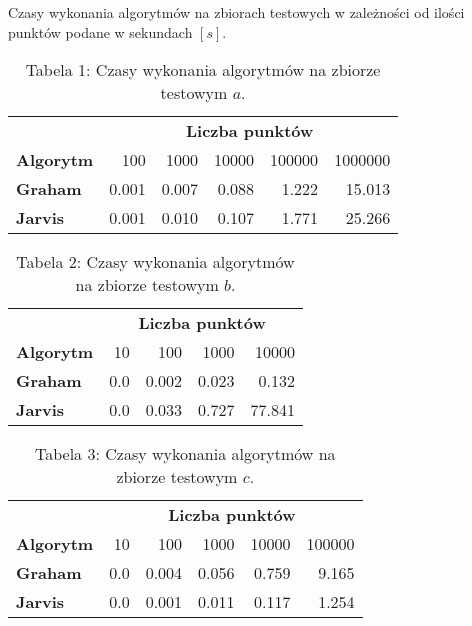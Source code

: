\quad Czasy wykonania algorytmów na zbiorach testowych w zależności od ilości punktów podane w sekundach $[s]$.
\renewcommand{\arraystretch}{2}
\begin{table}[!ht]
    \centering
\begin{tabular}{l  r| r| r| r|r|}
     & \multicolumn{5}{c}{\textbf{Liczba punktów}} \\ \cline{2-6}     
     \multicolumn{1}{l|}{\textbf{Algorytm}} & {100} & 1000 & 10000 & 100000 & 1000000 \\
    \hline
    \hline
    \multicolumn{1}{l|}{\textbf{Graham}} & 0.001&	0.007&	0.088	&1.222&	15.013 \\
    \hline
    \multicolumn{1}{l|}{\textbf{Jarvis}} & 0.001	&0.010	&0.107	&1.771	&25.266 \\
    \cline{2-6}
\end{tabular}
\caption*{Tabela 1: Czasy wykonania algorytmów na zbiorze testowym $a$.}
\end{table}

\begin{table}[ht]
    \centering
\begin{tabular}{l  r|r|r|r|}
    & \multicolumn{4}{c}{\textbf{Liczba punktów}} \\ \cline{2-5}     
    \multicolumn{1}{l|}{\textbf{Algorytm}} & 10& 100& 1000& 10000 \\
   \hline
   \hline
   \multicolumn{1}{l|}{\textbf{Graham}} & 0.0& 0.002& 0.023& 0.132 \\
   \hline
   \multicolumn{1}{l|}{\textbf{Jarvis}} & 0.0& 0.033& 0.727& 77.841 \\
   \cline{2-5}
\end{tabular}
\caption*{Tabela 2: Czasy wykonania algorytmów na zbiorze testowym $b$.}
\end{table}

\begin{table}[ht]
    \centering
\begin{tabular}{l  r|r|r|r|r|}
    & \multicolumn{5}{c}{\textbf{Liczba punktów}} \\ \cline{2-6}     
    \multicolumn{1}{l|}{\textbf{Algorytm}} &  10& 100& 1000& 10000& 100000 \\
   \hline
   \hline
   \multicolumn{1}{l|}{\textbf{Graham}} & 0.0& 0.004& 0.056& 0.759& 9.165 \\
   \hline
   \multicolumn{1}{l|}{\textbf{Jarvis}} & 0.0& 0.001& 0.011& 0.117& 1.254 \\
   \cline{2-6}
\end{tabular}
\caption*{Tabela 3: Czasy wykonania algorytmów na zbiorze testowym $c$.}
\end{table}

